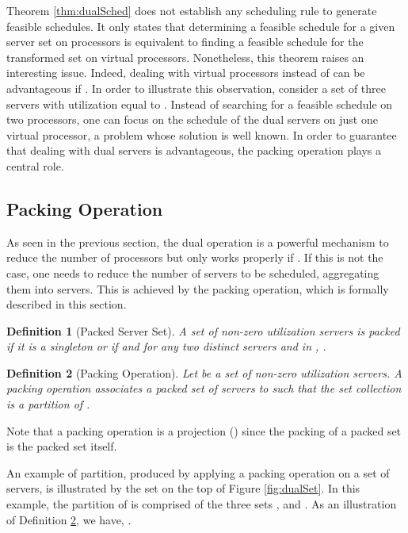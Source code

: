 \documentclass[twocolumn, compsocconf]{IEEEtran}
\newtheorem{definition}{Definition}[section]
\newcounter{proc}
\begin{document}
Theorem \ref{thm:dualSched} does not establish any scheduling rule to generate
feasible schedules. It only states that determining a feasible schedule for a
given server set on  processors is equivalent to finding a feasible schedule
for the transformed set on  virtual processors.  Nonetheless, this theorem
raises an interesting issue. Indeed, dealing with  virtual processors
instead of  can be advantageous if . In order to illustrate this
observation, consider a set of three servers with utilization equal to
. Instead of searching for a feasible schedule on two processors, one can
focus on the schedule of the dual servers on just one virtual processor, a
problem whose solution is well known. In order to guarantee that dealing with
dual servers is advantageous, the packing operation plays a central role.

\subsection{Packing Operation}
\label{sec:packing}

As seen in the previous section, the dual operation is a powerful mechanism to
reduce the number of processors but only works properly if . If this is
not the case, one needs to reduce the number of servers to be scheduled,
aggregating them into servers. This is achieved by the packing operation, which
is formally described in this section.

\begin{definition}[Packed Server Set]\label{dfn:packedSet}
  A set of non-zero utilization servers  is packed if it is a
  singleton or if  and for any two distinct servers  and
   in , .
\end{definition}





\begin{definition}[Packing Operation]\label{dfn:packMap}
  Let  be a set of non-zero utilization servers. A packing operation
   associates a packed set of servers  to 
  such that the set collection  is a
  partition of .
\end{definition}



Note that a packing operation is a projection ()
since the packing of a packed set is the packed set itself.


An example of partition, produced by applying a packing operation on a set
 of  servers, is illustrated by the set  on the
top of Figure \ref{fig:dualSet}. In this example, the partition of  is
comprised of the three sets ,  and
. As an illustration of Definition \ref{dfn:packMap}, we
have, .
\end{document}

